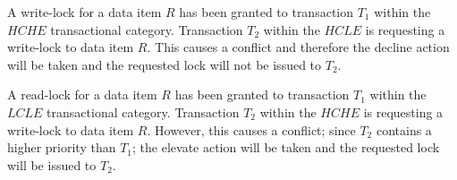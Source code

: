 \begin{definition}

 
 \begin{example}
 \label{ex_decline_action}
  A write-lock for a data item $R$ has been granted to transaction $T_{1}$ within the $HCHE$ transactional category. Transaction $T_{2}$ within the $HCLE$ is requesting a write-lock to data item $R$. This causes a conflict and therefore the decline action will be taken and the requested lock will not be issued to $T_{2}$.
 \end{example}
 

 
 \begin{example}
 \label{ex_elevate_action}
  A read-lock for a data item $R$ has been granted to transaction $T_{1}$ within the $LCLE$ transactional category. Transaction $T_{2}$ within the $HCHE$ is requesting a write-lock to data item $R$. However, this causes a conflict; since $T_{2}$ contains a higher priority than $T_{1}$; the elevate action will be taken and the requested lock will be issued to $T_{2}$.
 \end{example}
 
\end{definition}